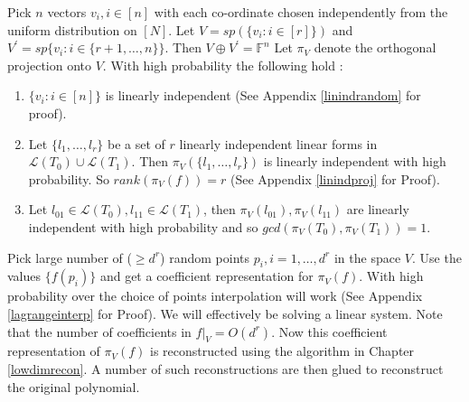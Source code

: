 \documentclass[letterpaper,USenglish,numberwithinsect]{lipics}
\newcommand{\F}{\mathbb{F}}
\newcommand{\ML}{\mathcal{L}}
\begin{document}
Pick $n$ vectors $v_i, i\in [n]$ with each co-ordinate chosen independently from the uniform distribution on $[N]$.
Let $V = sp(\{v_i : i\in [r]\})$ and $V^\prime = sp\{v_i : i\in \{r+1,\ldots,n\}\}$. Then $V\oplus V^\prime = \F^n$ Let $\pi_V$
denote the orthogonal projection onto $V$.
With high probability the following hold :
\begin{enumerate}
\item $\{v_i : i\in [n]\}$ is linearly independent (See Appendix \ref{linindrandom} for proof).
\item Let $\{l_1,\ldots,l_r\}$ be a set of $r$ linearly independent linear forms in $\ML(T_0)\cup
\ML(T_1)$. Then $\pi_{V}(\{l_1,\ldots,l_r\})$ is linearly independent with high probability. So
 $rank(\pi_V(f))=r$ (See Appendix \ref{linindproj} for Proof).
\item Let $l_{01}\in \ML(T_0), l_{11}\in \ML(T_1)$, then
$\pi_V(l_{01}), \pi_V(l_{11})$ are linearly independent with high probability and so $gcd(\pi_V(T_0), \pi_V(T_1))=1$.
\end{enumerate}
Pick large number of ($\geq d^{r}$) random points $p_i, i=1,\ldots,d^{r}$
in the space $V$. Use the values $\{f(p_i)\}$ and get a coefficient representation for
$\pi_V(f)$. With high probability over
the choice of points interpolation will work (See Appendix
\ref{lagrangeinterp} for Proof). We will effectively be solving a linear system. Note that the number of coefficients in $f|_{V} = O(d^r)$.
Now this coefficient representation of $\pi_V(f)$ is reconstructed using the
algorithm in Chapter \ref{lowdimrecon}. A number of such reconstructions are then glued to reconstruct the original polynomial.
\end{document}
